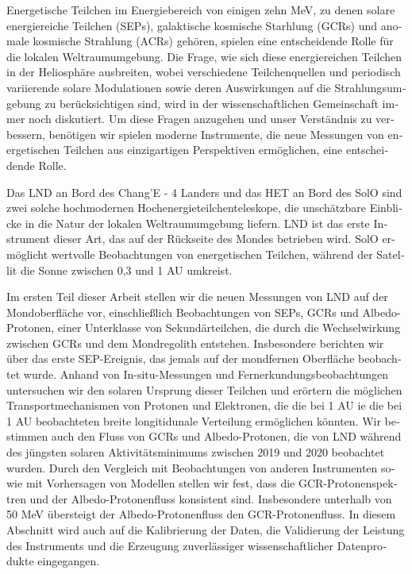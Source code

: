 \begin{otherlanguage}{ngerman}
    Energetische Teilchen im Energiebereich von einigen zehn MeV, zu denen solare energiereiche Teilchen (SEPs), galaktische kosmische Starhlung (GCRs) und anomale kosmische Strahlung (ACRs) gehören, spielen eine entscheidende Rolle für die lokalen Weltraumumgebung. Die Frage, wie sich diese energiereichen Teilchen in der Heliosphäre ausbreiten, wobei verschiedene Teilchenquellen und periodisch variierende solare Modulationen sowie deren Auswirkungen auf die Strahlungsumgebung zu berücksichtigen sind, wird in der wissenschaftlichen Gemeinschaft immer noch diskutiert. Um diese Fragen anzugehen und unser Verständnis zu verbessern, benötigen wir spielen moderne Instrumente, die neue Messungen von energetischen Teilchen aus einzigartigen Perspektiven ermöglichen, eine entscheidende Rolle.

    Das \ac{LND} an Bord des Chang'E - 4 Landers und das \ac{HET} an Bord des \ac{SolO} sind zwei solche hochmodernen Hochenergieteilchenteleskope, die unschätzbare Einblicke in die Natur der lokalen Weltraumumgebung liefern. \ac{LND} ist das erste Instrument dieser Art, das auf der Rückseite des Mondes betrieben wird. \ac{SolO} ermöglicht wertvolle Beobachtungen von energetischen Teilchen, w\"{a}hrend der Satellit die Sonne zwischen 0,3 und 1 AU umkreist.
    
    Im ersten Teil dieser Arbeit stellen wir die neuen Messungen von \ac{LND} auf der Mondoberfläche vor, einschließlich Beobachtungen von \acp{SEP}, \acp{GCR} und Albedo-Protonen, einer Unterklasse von Sekundärteilchen, die durch die Wechselwirkung zwischen \acp{GCR} und dem Mondregolith entstehen. Insbesondere berichten wir über das erste \ac{SEP}-Ereignis, das jemals auf der mondfernen Oberfläche beobachtet wurde. Anhand von In-situ-Messungen und Fernerkundungsbeobachtungen untersuchen wir den solaren Ursprung dieser Teilchen und erörtern die möglichen Transportmechanismen von Protonen und Elektronen, die die bei 1 AU ie die bei 1 AU beobachteten breite longitidunale Verteilung ermöglichen könnten. Wir bestimmen auch den Fluss von \acp{GCR} und Albedo-Protonen, die von \ac{LND} während des jüngsten solaren Aktivitätsminimums zwischen 2019 und 2020 beobachtet wurden. Durch den Vergleich mit Beobachtungen von anderen Instrumenten sowie mit Vorhersagen von Modellen stellen wir fest, dass die \ac{GCR}-Protonenspektren und der Albedo-Protonenfluss konsistent sind. Insbesondere unterhalb von 50 MeV übersteigt der Albedo-Protonenfluss den \ac{GCR}-Protonenfluss.
    In diesem Abschnitt wird auch auf die Kalibrierung der Daten, die Validierung der Leistung des Instruments und die Erzeugung zuverlässiger wissenschaftlicher Datenprodukte eingegangen.
    

\end{otherlanguage}
